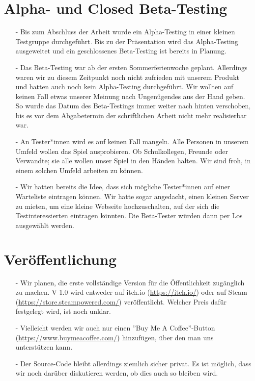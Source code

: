 \section{Alpha- und Closed Beta-Testing}
\begin{itemize}
    \item[-] Bis zum Abschluss der Arbeit wurde ein Alpha-Testing in einer kleinen Testgruppe durchgeführt. Bis zu der Präsentation wird
    das Alpha-Testing ausgeweitet und ein geschlossenes Beta-Testing ist bereits in Planung. 
    \item[-] Das Beta-Testing war ab der ersten Sommerferienwoche geplant. Allerdings waren wir zu diesem Zeitpunkt noch nicht zufrieden mit unserem Produkt und hatten auch noch kein Alpha-Testing durchgeführt. Wir wollten
    auf keinen Fall etwas unserer Meinung nach Ungenügendes aus der Hand geben. So wurde das Datum des Beta-Testings immer weiter nach hinten verschoben, bis es vor dem Abgabetermin der schriftlichen Arbeit nicht mehr realisierbar war.
    \item[-] An Tester*innen wird es auf keinen Fall mangeln. Alle Personen in unserem Umfeld wollen
    das Spiel ausprobieren. Ob Schulkollegen, Freunde oder Verwandte; sie alle wollen unser Spiel in den Händen halten. Wir sind froh, in einem solchen Umfeld arbeiten zu können.
    \item[-] Wir hatten bereits die Idee, dass sich mögliche Tester*innen auf einer Warteliste eintragen können. Wir hatte sogar angedacht, einen kleinen Server zu mieten,
    um eine kleine Webseite hochzuschalten, auf der sich die Testinteressierten eintragen könnten. Die Beta-Tester würden dann per Los ausgewählt werden.
\end{itemize}

\section{Veröffentlichung}
\begin{itemize}
    \item[-] Wir planen, die erste vollständige Version für die Öffentlichkeit zugänglich zu machen. V 1.0 wird entweder auf itch.io (\url{https://itch.io/}) oder auf \gls{Steam} 
    (\url{https://store.steampowered.com/}) veröffentlicht. Welcher Preis dafür festgelegt wird, ist noch unklar.
    \item[-] Vielleicht werden wir auch nur einen ''Buy Me A Coffee''-Button (\url{https://www.buymeacoffee.com/}) hinzufügen, über den man uns unterstützen kann. 
    \item[-] Der Source-Code bleibt allerdings ziemlich sicher privat. Es ist möglich, dass wir noch darüber diskutieren werden, ob dies auch so bleiben wird.
\end{itemize}



